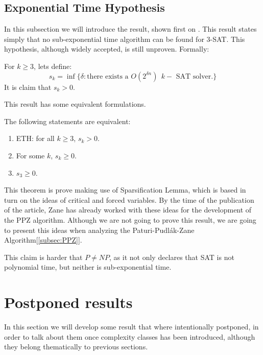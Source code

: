 \subsection{Exponential Time Hypothesis}
\label{hyp:exponential_time}
In this subsection we will introduce the result, shown first on \cite{impagliazzo2001complexity}. This result states simply that no sub-exponential time algorithm can be found for 3-SAT. This hypothesis, although widely accepted, is still unproven. Formally:

\begin{definition}[ETH]
  For $k\ge 3$, lets define:
  $$s_k=\inf\{\delta: \text{there exists a } O(2^{\delta n})\ \ k-\text{ SAT solver.}\}$$
  It is claim that $s_k>0$.
\end{definition}

This result has some equivalent formulations.

\begin{proposition}
  The following statements are equivalent:
  \begin{enumerate}
  \item ETH: for all $k\ge 3$, $s_k > 0$.
  \item For some $k$, $s_k \ge 0$.
  \item $s_3 \ge 0$.

  \end{enumerate}
  \end{proposition}

This theorem is prove making use of Sparsification Lemma, which is based in turn on the ideas of critical and forced variables. By the time of the publication of the article, Zane has already worked with these ideas for the development of the PPZ algorithm\cite{paturi1997satisfiability}. Although we are not going to prove this result, we are going to present this ideas when analyzing the Paturi-Pudlák-Zane Algorithm[\ref{subsec:PPZ}].
 
This claim is harder that $P\ne NP$, as it not only declares that SAT is not polynomial time, but neither is sub-exponential time. 

\section{Postponed results}
In this section we will develop some result that where intentionally postponed, in order to talk about them once complexity classes has been introduced, although they belong thematically to previous sections. 
